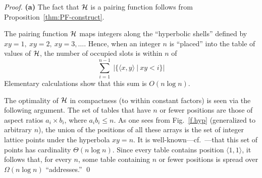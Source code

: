 \begin{proof}
{\bf (a)} The fact that $\mbox{$\cal H$}$ is a pairing function follows from Proposition~\ref{thm:PF-construct}.

\smallskip

The pairing function $\mbox{$\cal H$}$ maps integers along the ``hyperbolic shells'' defined by $xy = 1, \ xy =2, \ xy=3, \ldots$.  Hence, when an integer $n$ is ``placed'' into the table of values of $\mbox{$\cal H$}$, the number of occupied slots is within $n$ of
\[ \sum_{i=1}^{n-1} \ |\{ \langle x,y \rangle \ | \ xy < i \}|  \]
Elementary calculations show that this sum is $O(n \log n)$.

\smallskip

The optimality of $\mbox{$\cal H$}$ in compactness (to within constant factors) is seen via the following argument.  The set of tables that have $n$ or fewer positions are those of aspect ratios $a_i \times b_i$, where $a_i b_i \leq n$.  As one sees from Fig.~\ref{f.hyp} (generalized to arbitrary $n$), the union of the positions of all these arrays is the set of integer lattice points under the hyperbola $xy = n$.  It is well-known---cf.~\cite{NivenZ80}---that this set of points has cardinality $\Theta(n \log n)$.  Since every table contains position $\langle 1,1 \rangle$, it follows that, for every $n$, some table containing $n$ or fewer positions is spread over $\Omega(n \log n)$ ``addresses.''  \qed
\end{proof}
